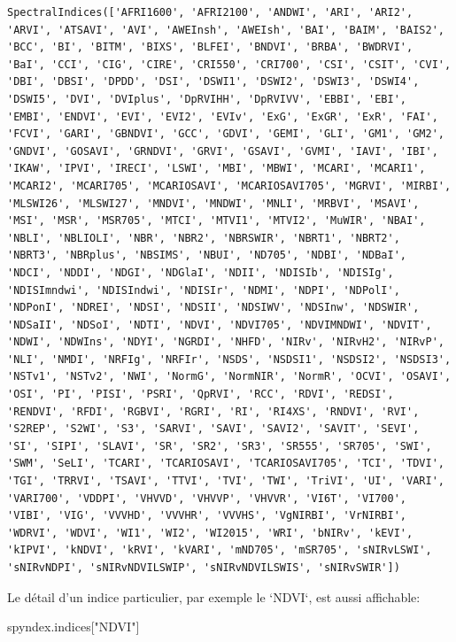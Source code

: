 \documentclass[
  11pt,
  letterpaper,
  open=any,
  twoside=false,
  french]{scrbook}
\newenvironment{Shaded}{\begin{snugshade}}{\end{snugshade}}
\newcommand{\NormalTok}[1]{\textcolor[rgb]{0.00,0.23,0.31}{#1}}
\newcommand{\StringTok}[1]{\textcolor[rgb]{0.13,0.47,0.30}{#1}}
\begin{document}
\begin{verbatim}
SpectralIndices(['AFRI1600', 'AFRI2100', 'ANDWI', 'ARI', 'ARI2', 'ARVI', 'ATSAVI', 'AVI', 'AWEInsh', 'AWEIsh', 'BAI', 'BAIM', 'BAIS2', 'BCC', 'BI', 'BITM', 'BIXS', 'BLFEI', 'BNDVI', 'BRBA', 'BWDRVI', 'BaI', 'CCI', 'CIG', 'CIRE', 'CRI550', 'CRI700', 'CSI', 'CSIT', 'CVI', 'DBI', 'DBSI', 'DPDD', 'DSI', 'DSWI1', 'DSWI2', 'DSWI3', 'DSWI4', 'DSWI5', 'DVI', 'DVIplus', 'DpRVIHH', 'DpRVIVV', 'EBBI', 'EBI', 'EMBI', 'ENDVI', 'EVI', 'EVI2', 'EVIv', 'ExG', 'ExGR', 'ExR', 'FAI', 'FCVI', 'GARI', 'GBNDVI', 'GCC', 'GDVI', 'GEMI', 'GLI', 'GM1', 'GM2', 'GNDVI', 'GOSAVI', 'GRNDVI', 'GRVI', 'GSAVI', 'GVMI', 'IAVI', 'IBI', 'IKAW', 'IPVI', 'IRECI', 'LSWI', 'MBI', 'MBWI', 'MCARI', 'MCARI1', 'MCARI2', 'MCARI705', 'MCARIOSAVI', 'MCARIOSAVI705', 'MGRVI', 'MIRBI', 'MLSWI26', 'MLSWI27', 'MNDVI', 'MNDWI', 'MNLI', 'MRBVI', 'MSAVI', 'MSI', 'MSR', 'MSR705', 'MTCI', 'MTVI1', 'MTVI2', 'MuWIR', 'NBAI', 'NBLI', 'NBLIOLI', 'NBR', 'NBR2', 'NBRSWIR', 'NBRT1', 'NBRT2', 'NBRT3', 'NBRplus', 'NBSIMS', 'NBUI', 'ND705', 'NDBI', 'NDBaI', 'NDCI', 'NDDI', 'NDGI', 'NDGlaI', 'NDII', 'NDISIb', 'NDISIg', 'NDISImndwi', 'NDISIndwi', 'NDISIr', 'NDMI', 'NDPI', 'NDPolI', 'NDPonI', 'NDREI', 'NDSI', 'NDSII', 'NDSIWV', 'NDSInw', 'NDSWIR', 'NDSaII', 'NDSoI', 'NDTI', 'NDVI', 'NDVI705', 'NDVIMNDWI', 'NDVIT', 'NDWI', 'NDWIns', 'NDYI', 'NGRDI', 'NHFD', 'NIRv', 'NIRvH2', 'NIRvP', 'NLI', 'NMDI', 'NRFIg', 'NRFIr', 'NSDS', 'NSDSI1', 'NSDSI2', 'NSDSI3', 'NSTv1', 'NSTv2', 'NWI', 'NormG', 'NormNIR', 'NormR', 'OCVI', 'OSAVI', 'OSI', 'PI', 'PISI', 'PSRI', 'QpRVI', 'RCC', 'RDVI', 'REDSI', 'RENDVI', 'RFDI', 'RGBVI', 'RGRI', 'RI', 'RI4XS', 'RNDVI', 'RVI', 'S2REP', 'S2WI', 'S3', 'SARVI', 'SAVI', 'SAVI2', 'SAVIT', 'SEVI', 'SI', 'SIPI', 'SLAVI', 'SR', 'SR2', 'SR3', 'SR555', 'SR705', 'SWI', 'SWM', 'SeLI', 'TCARI', 'TCARIOSAVI', 'TCARIOSAVI705', 'TCI', 'TDVI', 'TGI', 'TRRVI', 'TSAVI', 'TTVI', 'TVI', 'TWI', 'TriVI', 'UI', 'VARI', 'VARI700', 'VDDPI', 'VHVVD', 'VHVVP', 'VHVVR', 'VI6T', 'VI700', 'VIBI', 'VIG', 'VVVHD', 'VVVHR', 'VVVHS', 'VgNIRBI', 'VrNIRBI', 'WDRVI', 'WDVI', 'WI1', 'WI2', 'WI2015', 'WRI', 'bNIRv', 'kEVI', 'kIPVI', 'kNDVI', 'kRVI', 'kVARI', 'mND705', 'mSR705', 'sNIRvLSWI', 'sNIRvNDPI', 'sNIRvNDVILSWIP', 'sNIRvNDVILSWIS', 'sNIRvSWIR'])
\end{verbatim}

Le détail d'un indice particulier, par exemple le `NDVI`, est aussi
affichable:

\begin{Shaded}
\begin{Highlighting}[]
\NormalTok{spyndex.indices[}\StringTok{"NDVI"}\NormalTok{]}
\end{Highlighting}
\end{Shaded}
\end{document}
